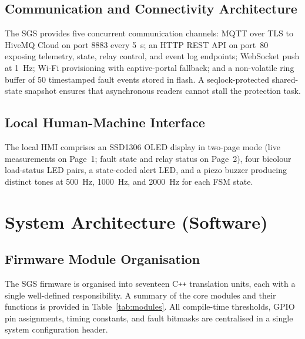\documentclass[conference]{IEEEtran}
\begin{document}
\subsection{Communication and Connectivity Architecture}

The SGS provides five concurrent communication channels: MQTT over TLS
to HiveMQ Cloud on port 8883 every \SI{5}{\second}; an HTTP REST API on
port~80 exposing telemetry, state, relay control, and event log
endpoints; WebSocket push at \SI{1}{\hertz}; Wi-Fi provisioning with
captive-portal fallback; and a non-volatile ring buffer of 50
timestamped fault events stored in flash.  A seqlock-protected
shared-state snapshot ensures that asynchronous readers cannot stall the
protection task.

\subsection{Local Human-Machine Interface}

The local HMI comprises an SSD1306 OLED display in two-page mode
(live measurements on Page~1; fault state and relay status on Page~2),
four bicolour load-status LED pairs, a state-coded alert LED, and a
piezo buzzer producing distinct tones at \SI{500}{\hertz},
\SI{1000}{\hertz}, and \SI{2000}{\hertz} for each FSM state.

\section{System Architecture (Software)}

\subsection{Firmware Module Organisation}

The SGS firmware is organised into seventeen C\texttt{++} translation
units, each with a single well-defined responsibility.  A summary of the
core modules and their functions is provided in Table~\ref{tab:modules}.
All compile-time thresholds, GPIO pin assignments, timing constants,
and fault bitmasks are centralised in a single system configuration
header.
\end{document}
